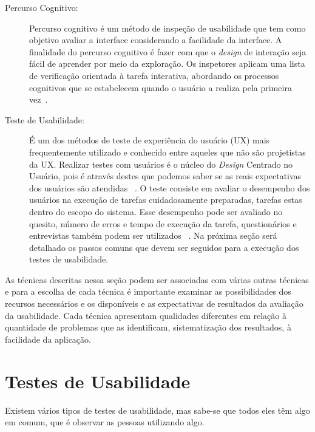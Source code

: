 \begin{description}

	
\item[Percurso Cognitivo:]

Percurso cognitivo é um método de inspeção de usabilidade que tem como objetivo avaliar a interface considerando a facilidade da interface. A finalidade do percurso cognitivo é fazer com que o \emph{design} de interação seja fácil de aprender por meio da exploração. Os inspetores aplicam uma lista de verificação orientada à tarefa interativa, abordando os processos cognitivos que se estabelecem quando o usuário a realiza pela primeira vez~\cite{cybis2010}.


\item[Teste de Usabilidade:]

É um dos métodos de teste de experiência do usuário (UX) mais frequentemente utilizado e conhecido entre aqueles que não são projetistas da UX. Realizar testes com usuários é o núcleo do \emph{Design} Centrado no Usuário, pois é através destes que podemos saber se as reais expectativas dos usuários são atendidas ~\cite{santos2012}.
%
O teste consiste em avaliar o desempenho dos usuários na execução de tarefas cuidadosamente preparadas, tarefas estas dentro do escopo do sistema. Esse desempenho pode ser avaliado no quesito, número de erros e tempo de execução da tarefa, questionários e entrevistas também podem ser utilizados ~\cite{preece2007}. Na próxima seção será detalhado os passos comuns que devem ser seguidos para a execução dos testes de usabilidade.

\end{description}

	As técnicas descritas nessa seção podem ser associadas com várias outras técnicas e para a escolha de cada técnica é importante examinar as possibilidades dos recursos necessários e os disponíveis e as expectativas de resultados da avaliação da usabilidade. Cada técnica apresentam qualidades diferentes em relação à quantidade de problemas que as identificam, sistematização dos resultados, à facilidade da aplicação. 
%

\section{Testes de Usabilidade}
\label{testes_u}
{	Existem vários tipos de testes de usabilidade, mas sabe-se que todos eles têm algo em comum, que é observar as pessoas utilizando algo.
}

